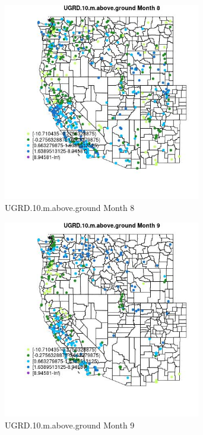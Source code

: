 \begin{figure} 
\centering  
\includegraphics[width=0.77\textwidth]{Code_Outputs/Report_ML_input_PM25_Step4_part_e_de_duplicated_aves_compiled_2019-05-18wNAs_MapObsMo8UGRD10maboveground.jpg} 
\caption{\label{fig:Report_ML_input_PM25_Step4_part_e_de_duplicated_aves_compiled_2019-05-18wNAsMapObsMo8UGRD10maboveground}UGRD.10.m.above.ground Month 8} 
\end{figure} 
 

\begin{figure} 
\centering  
\includegraphics[width=0.77\textwidth]{Code_Outputs/Report_ML_input_PM25_Step4_part_e_de_duplicated_aves_compiled_2019-05-18wNAs_MapObsMo9UGRD10maboveground.jpg} 
\caption{\label{fig:Report_ML_input_PM25_Step4_part_e_de_duplicated_aves_compiled_2019-05-18wNAsMapObsMo9UGRD10maboveground}UGRD.10.m.above.ground Month 9} 
\end{figure} 
 

